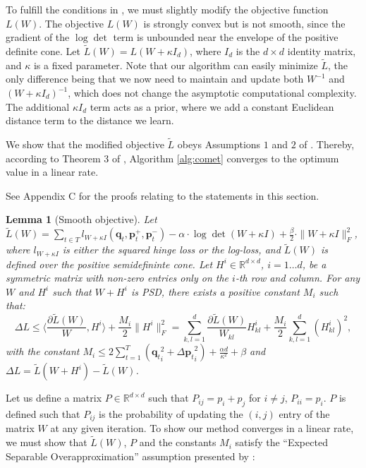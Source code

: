 \documentclass{article} %
\newcommand\mat[1]{{#1}}
\renewcommand\vec[1]{\mathbf{#1}}
\newcommand{\W}{\mat{W}}
\newcommand{\Hh}{\mat{H}}
\newcommand{\Pp}{\mat{P}}
\newcommand{\R}{\mathbb{R}}
\newcommand{\tL}{\tilde{L}(\W)}
\newcommand{\frobsq}[1]{{\|#1\|_F^2}}
\newcommand{\q}{{\vec{q}}}
\newcommand{\trip}{{t}}
\newcommand{\qt}{{\q_{\trip}}}
\newcommand{\grd}{\frac{\partial \tL}{\W}}
\newcommand{\grdkl}{\frac{\partial \tL}{\W_{kl}}}
\newtheorem{lemma}{Lemma}
\begin{document}
To fulfill the conditions in \cite{richtarik2013optimal}, we must slightly modify the objective function $L({\W})$. The objective $L(\W)$ is strongly convex but is not smooth, since the gradient of the $\log \det$ term is unbounded near the envelope of the positive definite cone. Let $\tilde{L}({\W}) = L({\W + \kappa I_d})$, where $I_d$ is the $d \times d$ identity matrix, and $\kappa$ is a fixed parameter.
Note that our algorithm can easily minimize $\tilde{L}$, the only difference being that we now need to maintain and update both $\W^{-1}$ and $(\W+\kappa I_d)^{-1}$, which does not change the asymptotic computational complexity. The additional $\kappa I_d$ term acts as a prior, where we add a constant Euclidean distance term to the distance we learn. 

We show that the modified objective $\tilde{L}$ obeys Assumptions $1$ and $2$ of \citet{richtarik2013optimal}. Thereby, according to Theorem 3 of \citeauthor{richtarik2013optimal}, Algorithm \ref{alg:comet} converges to the optimum value in a linear rate.

See Appendix C for the proofs relating to the statements in this section.
\begin{lemma}[Smooth objective]
\label{lem:smooth}
Let 
$\tL=\sum\limits_{t\in T}{l_{\W + \kappa I}(\vec{q}_t, \vec{p}_{t}^{+}, \vec{p}_{t}^{-})} -
\alpha \cdot \log \det(\W + \kappa I) + \tfrac{\beta}{2}  \cdot \| \W + \kappa I \|_{F}^{2}$, 
where $l_{\W + \kappa I}$ is either the squared hinge loss or the log-loss, and $\tL$ is defined over the positive semidefininte cone. 
Let $\Hh^i \in \R^{d \times d}$, $i=1 \ldots d$, be a symmetric matrix with non-zero entries only on the $i$-th row and column.
For any $\W$ and $\Hh^i$ such that $\W + \Hh^i$ is PSD, there exists a positive constant $M_i$ such that:
\begin{equation}
\label{eq:ineq}
\Delta L \leq  \langle \grd, \Hh^i \rangle + \frac{M_i}{2} \frobsq{\Hh^i} = \sum_{k,l=1}^d  \grdkl \Hh_{kl}^i + \frac{M_i}{2} \sum_{k,l=1}^d  (\Hh_{kl}^i)^2, \nonumber
\end{equation}
with the constant $M_i \leq  2 \sum_{t=1}^T (\qt_i^2 +{\Delta\vec{p}_{t}}_i^2) + \frac{\alpha d}{\kappa ^2} + \beta$ and $\Delta L = \tilde{L}(\W + \Hh^i) - \tL$.
\end{lemma}

Let us define a matrix $\Pp \in \R^{d \times d}$ such that $\Pp_{ij} = p_i + p_j$ for $i \ne j$, $\Pp_{ii} = p_i$. $\Pp$ is defined such that $\Pp_{ij}$ is the probability of updating the $(i,j)$ entry of the matrix $\W$ at any given iteration. To show our method converges in a linear rate, we must show that $\tL$, $\Pp$ and the constants $M_i$ satisfy the ``Expected Separable Overapproximation'' assumption presented by \citet{richtarik2013optimal}:
\end{document}
